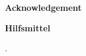 
\begin{center}
{\sffamily \bfseries\Large Acknowledgement}\\
\end{center}%
\vspace{1cm}
%


%
%
\vspace{3cm}
%
\begin{center}
{\sffamily \bfseries\Large Hilfsmittel}\\
\end{center}%
\vspace{1cm}
.
